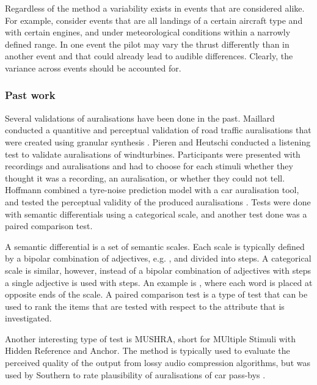 Regardless of the method a variability exists in events that are considered
alike. For example, consider events that are all landings of a certain aircraft
type and with certain engines, and under meteorological conditions within a narrowly
defined range. In one event the pilot may vary the thrust differently than in
another event and that could already lead to audible differences.
Clearly, the variance across events should be accounted for.

\subsubsection*{Past work}
Several validations of auralisations have been done in the past. Maillard
conducted a quantitive and perceptual validation of road traffic auralisations
that were created using granular synthesis \cite{Maillard2014}. Pieren and
Heutschi conducted a listening test to validate auralisations of
windturbines. Participants were presented with recordings and auralisations and
had to choose for each stimuli whether they thought it was a recording, an
auralisation, or whether they could not tell. Hoffmann combined a tyre-noise
prediction model with a car auralisation tool, and tested the perceptual
validity of the produced auralisations \cite{Hoffmann2016a,Hoffmann2016}. Tests
were done with semantic differentials using a categorical scale, and another
test done was a paired comparison test.

A semantic differential is a set of semantic scales. Each scale is typically
defined by a bipolar combination of adjectives, e.g. , and
divided into steps. A categorical scale is similar, however, instead of a
bipolar combination of adjectives with steps a single adjective is used with
steps. An example is , where each word is placed at opposite
ends of the scale. A paired comparison test is a type of test that can be used
to rank the items that are tested with respect to the attribute that is
investigated.

Another interesting type of test is MUSHRA, short for MUltiple Stimuli with
Hidden Reference and Anchor. The method is typically used to evaluate the
perceived quality of the output from lossy audio compression algorithms, but was
used by Southern to rate plausibility of auralisations of car pass-bys
\cite{Southern2016}.

